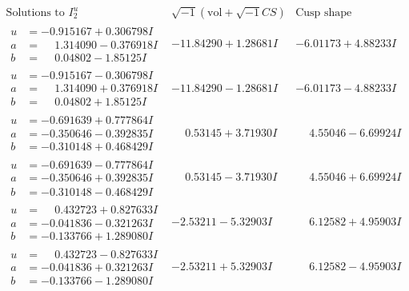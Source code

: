 \documentclass[1p]{elsarticle_modified}
\theoremstyle{definition}
\newcommand{\I}{\sqrt{-1}}
\begin{document}
$$\begin{array}{c|c|c}  
\text{Solutions to }I^u_{2}& \I (\text{vol} + \sqrt{-1}CS) & \text{Cusp shape}\\
 \hline 
\begin{aligned}
u &= -0.915167 + 0.306798 I \\
a &= \phantom{-}1.314090 - 0.376918 I \\
b &= \phantom{-}0.04802 - 1.85125 I\end{aligned}
 & -11.84290 + 1.28681 I & -6.01173 + 4.88233 I \\ \hline\begin{aligned}
u &= -0.915167 - 0.306798 I \\
a &= \phantom{-}1.314090 + 0.376918 I \\
b &= \phantom{-}0.04802 + 1.85125 I\end{aligned}
 & -11.84290 - 1.28681 I & -6.01173 - 4.88233 I \\ \hline\begin{aligned}
u &= -0.691639 + 0.777864 I \\
a &= -0.350646 - 0.392835 I \\
b &= -0.310148 + 0.468429 I\end{aligned}
 & \phantom{-}0.53145 + 3.71930 I & \phantom{-}4.55046 - 6.69924 I \\ \hline\begin{aligned}
u &= -0.691639 - 0.777864 I \\
a &= -0.350646 + 0.392835 I \\
b &= -0.310148 - 0.468429 I\end{aligned}
 & \phantom{-}0.53145 - 3.71930 I & \phantom{-}4.55046 + 6.69924 I \\ \hline\begin{aligned}
u &= \phantom{-}0.432723 + 0.827633 I \\
a &= -0.041836 - 0.321263 I \\
b &= -0.133766 + 1.289080 I\end{aligned}
 & -2.53211 - 5.32903 I & \phantom{-}6.12582 + 4.95903 I \\ \hline\begin{aligned}
u &= \phantom{-}0.432723 - 0.827633 I \\
a &= -0.041836 + 0.321263 I \\
b &= -0.133766 - 1.289080 I\end{aligned}
 & -2.53211 + 5.32903 I & \phantom{-}6.12582 - 4.95903 I \\ \hline\begin{aligned}

\end{aligned}
\end{array}$$
\end{document}
